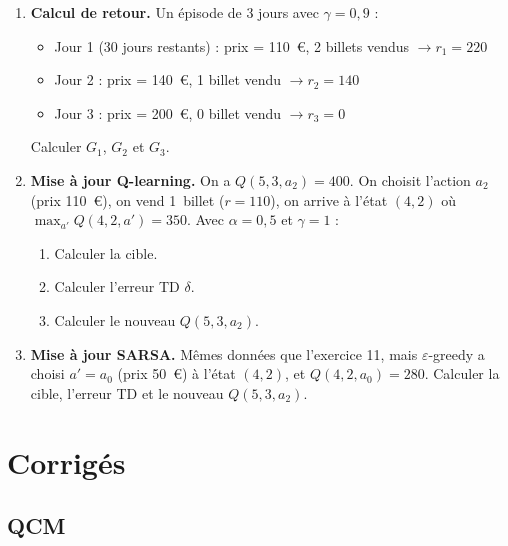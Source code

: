 \documentclass[11pt,a4paper]{article}
\begin{document}
\begin{enumerate}[resume]
\item \textbf{Calcul de retour.} Un épisode de 3 jours avec $\gamma = 0{,}9$ :
  \begin{itemize}[nosep]
    \item Jour 1 (30 jours restants) : prix = 110~€, 2 billets vendus $\to r_1 = 220$
    \item Jour 2 : prix = 140~€, 1 billet vendu $\to r_2 = 140$
    \item Jour 3 : prix = 200~€, 0 billet vendu $\to r_3 = 0$
  \end{itemize}
  Calculer $G_1$, $G_2$ et $G_3$.

\item \textbf{Mise à jour Q-learning.} On a $Q(5, 3, a_2) = 400$. On choisit l'action $a_2$ (prix 110~€), on vend 1~billet ($r = 110$), on arrive à l'état $(4, 2)$ où $\max_{a'} Q(4, 2, a') = 350$. Avec $\alpha = 0{,}5$ et $\gamma = 1$ :
  \begin{enumerate}[label=\alph*)]
    \item Calculer la cible.
    \item Calculer l'erreur TD $\delta$.
    \item Calculer le nouveau $Q(5, 3, a_2)$.
  \end{enumerate}

\item \textbf{Mise à jour SARSA.} Mêmes données que l'exercice 11, mais $\varepsilon$-greedy a choisi $a' = a_0$ (prix 50~€) à l'état $(4, 2)$, et $Q(4, 2, a_0) = 280$. Calculer la cible, l'erreur TD et le nouveau $Q(5, 3, a_2)$.
\end{enumerate}

\newpage
\section{Corrigés}
\label{sec:answers}

\subsection{QCM}
\end{document}
